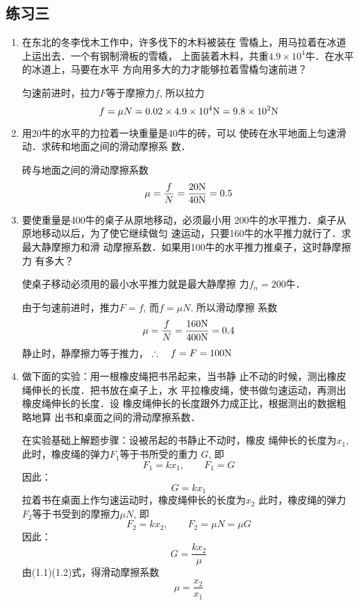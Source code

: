 \subsection{练习三}
\begin{enumerate}
\item  在东北的冬李伐木工作中，许多伐下的木料被装在
雪橇上，用马拉着在冰道上运出去．一个有钢制滑板的雪橇，
上面装着木料，共重$4.9\times 10^4$牛．在水平的冰道上，马要在水平
方向用多大的力才能够拉着雪橇匀速前进？

\begin{solution}
    匀速前进时，拉力$F$等于摩擦力$f$, 所以拉力
    \[f=\mu N=0.02\times4.9\times10^4{\rm N}=9.8\times 10^2{\rm N}\]
\end{solution}
\item  用20牛的水平的力拉着一块重量是40牛的砖，可以
使砖在水平地面上匀速滑动．求砖和地面之间的滑动摩擦系
数．

\begin{solution}
    砖与地面之间的滑动摩擦系数
    \[\mu=\frac{f}{N}=\frac{20{\rm N}}{40{\rm N}}=0.5\]
\end{solution}
\item  要使重量是400牛的桌子从原地移动，必须最小用
200牛的水平推力．桌子从原地移动以后，为了使它继续做匀
速运动，只要160牛的水平推力就行了．求最大静摩擦力和滑
动摩擦系数．如果用100牛的水平推力推桌子，这时静摩擦力
有多大？


\begin{solution}
    使桌子移动必须用的最小水平推力就是最大静摩擦
    力$f_n=200$牛．

    由于匀速前进时，推力$F=f$, 而$f=\mu N$. 所以滑动摩擦
    系数
    \[\mu=\frac{f}{N}=\frac{160{\rm N}}{400{\rm N}}=0.4\]
    静止时，静摩擦力等于推力，
    $\therefore\quad f=F=100{\rm N}$
\end{solution}
\item  做下面的实验：用一根橡皮绳把书吊起来，当书静
止不动的时候，测出橡皮绳伸长的长度．把书放在桌子上，水
平拉橡皮绳，使书做匀速运动，再测出橡皮绳伸长的长度．设
橡皮绳伸长的长度跟外力成正比，根据测出的数据粗略地算
出书和桌面之间的滑动摩擦系数．

\begin{solution}
    在实验基础上解题步骤：设被吊起的书静止不动时，橡皮
    绳伸长的长度为$x_1$, 此时，橡皮绳的弹力$F_1$等于书所受的重力
    $G$, 即$$F_1=kx_1,\qquad F_1=G$$ 因此：
\begin{equation}
     G=kx_1
\end{equation}   
    拉着书在桌面上作匀速运动时，橡皮绳伸长的长度为$x_2$
    此时，橡皮绳的弹力$F_2$等于书受到的摩擦力$\mu N$, 即
  \[  F_2=kx_2,\qquad F_2=\mu N=\mu G\]
因此：
\begin{equation}
    G=\frac{kx_2}{\mu}
\end{equation}
    由(1.1)(1.2)式，得滑动摩擦系数
    \[\mu=\frac{x_2}{x_1}\]
\end{solution}
\end{enumerate}


